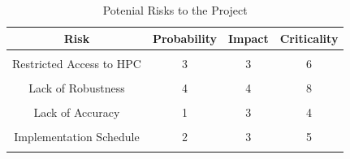 
\begin{table}[htp!]
\centering
\caption{Potenial Risks to the Project}
\label{tab:risks}
\begin{tabular}{|c|c|c|c|}
\hline
Risk &
Probability&
Impact &
Criticality\\ \hline\hline
& & & \\
Restricted Access to HPC & 3 & 3 & 6 \\ 
& & & \\
Lack of Robustness & 4 & 4 & 8 \\
& & & \\
Lack of Accuracy & 1 & 3 & 4 \\
& & & \\
Implementation Schedule & 2 & 3 & 5 \\
& & & \\
\hline
\end{tabular}
\end{table}
